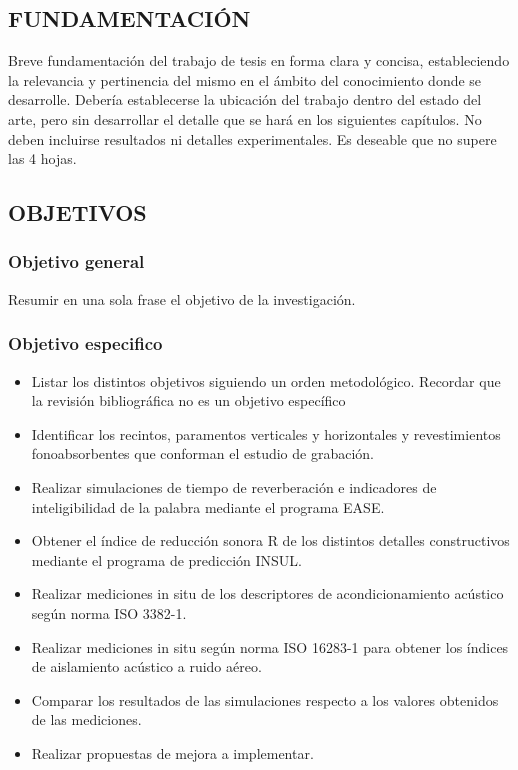 \subsection{FUNDAMENTACIÓN}

Breve fundamentación del trabajo de tesis en forma clara y concisa, estableciendo la relevancia y pertinencia del mismo en el ámbito del conocimiento donde se desarrolle. Debería establecerse la ubicación del trabajo dentro del estado del arte, pero sin desarrollar el detalle que se hará en los siguientes capítulos. No deben incluirse resultados ni detalles experimentales. Es deseable que no supere las 4 hojas.

\subsection{OBJETIVOS}

\subsubsection{Objetivo general}

Resumir en una sola frase el objetivo de la investigación.

\subsubsection{Objetivo especifico}

\begin{itemize}
    \item Listar los distintos objetivos siguiendo un orden metodológico. Recordar que la revisión bibliográfica no es un objetivo específico
    \item Identificar los recintos, paramentos verticales y horizontales y revestimientos fonoabsorbentes que conforman el estudio de grabación.
    \item Realizar simulaciones de tiempo de reverberación e indicadores de inteligibilidad de la palabra mediante el programa EASE.
    \item Obtener el índice de reducción sonora R de los distintos detalles constructivos mediante el programa de predicción INSUL.
    \item 	Realizar mediciones in situ de los descriptores de acondicionamiento acústico según norma ISO 3382-1.
    \item	Realizar mediciones in situ según norma ISO 16283-1 para obtener los índices de aislamiento acústico a ruido aéreo.
    \item Comparar los resultados de las simulaciones respecto a los valores obtenidos de las mediciones.
    \item Realizar propuestas de mejora a implementar.
\end{itemize}

